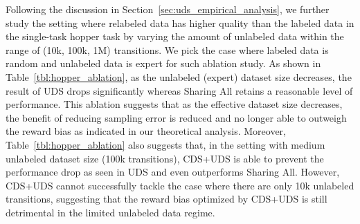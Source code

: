 \begin{table}[t!]
\centering
\scriptsize
{}
\caption{\footnotesize Ablation study on the unlabeled dataset size ranging from 10k to 1M transitions in the single-task hopper domain. We bold the best method without true reward relabeling.}
\label{tbl:hopper_ablation}
\normalsize
\end{table}

Following the discussion in Section~\ref{sec:uds_empirical_analysis}, we further study the setting where relabeled data has higher quality than the labeled data in the single-task hopper task by varying the amount of unlabeled data within the range of (10k, 100k, 1M) transitions. We pick the case where labeled data is random and unlabeled data is expert for such ablation study. As shown in Table~\ref{tbl:hopper_ablation}, as the unlabeled (expert) dataset size decreases, the result of UDS drops significantly whereas Sharing All retains a reasonable level of performance. This ablation suggests that as the effective dataset size decreases, the benefit of reducing sampling error is reduced and no longer able to outweigh the reward bias as indicated in our theoretical analysis. Moreover, Table~\ref{tbl:hopper_ablation} also suggests that, in the setting with medium unlabeled dataset size (100k transitions), CDS+UDS is able to prevent the performance drop as seen in UDS and even outperforms Sharing All. However, CDS+UDS cannot successfully tackle the case where there are only 10k unlabeled transitions, suggesting that the reward bias optimized by CDS+UDS is still detrimental in the limited unlabeled data regime.

\subsection{}
\label{app:reward_learning_ablation}

